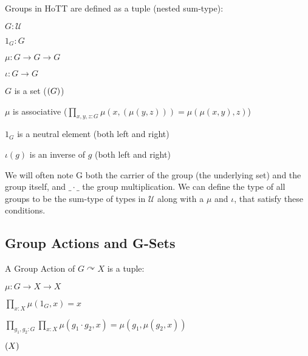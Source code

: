 \documentclass{article}
\DeclareMathOperator{\isset}{isSet}
\let\isset\relax
\DeclareMathOperator{\isset}{isSet}
\begin{document}
Groups in HoTT are defined as a tuple (nested sum-type):

\begin{itemize}
\begin{minipage}[c][3.2cm]{0.3\linewidth}
    \item $G : \mathcal{U}$
    \item $1_{G} : G$
    \item $\mu : G \to G \to G$
    \item $\iota : G \to G$
\end{minipage}
\begin{minipage}[c][3.2cm]{0.6\linewidth}
    \item $G$ is a set ($\isset(G)$)
    \item $\mu$ is associative ($\prod_{x,y,z : G} \mu(x,(\mu(y,z))) = \mu(\mu(x,y),z)$)
    \item $1_{G}$ is a neutral element (both left and right)
    \item $\iota(g)$ is an inverse of $g$ (both left and right)
\end{minipage}
\end{itemize}

We will often note G both the carrier of the group (the underlying set) and the group itself, and $\_\cdot\_$ the group multiplication. We can define the type of all groups to be the sum-type of types in $\mathcal{U}$ along with a $\mu$ and $\iota$, that satisfy these conditions.

\subsection{Group Actions and G-Sets}

A Group Action of $G \curvearrowright X$ is a tuple:

\begin{itemize}
\begin{minipage}[c][3cm]{0.3\linewidth}
        \item $\mu : G \to X \to X$
\end{minipage}
\begin{minipage}[c][3cm]{0.6\linewidth}
        \item $\displaystyle\prod_{x : X} \mu(1_{G}, x) = x $
        \item $\displaystyle\prod_{g_1, g_2 : G}\prod_{x : X} \mu(g_1 \cdot g_2, x) = \mu(g_1, \mu(g_2,x)) $
        \item $\isset(X)$
\end{minipage}
\end{itemize}
\end{document}
